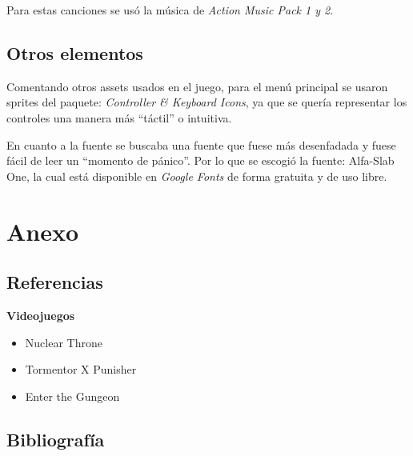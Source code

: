 \documentclass[12pt]{article}
\begin{document}
        Para estas canciones se usó la música de \textit{Action Music Pack 1 y 2}.
        
    \subsection{Otros elementos}
    
        Comentando otros assets usados en el juego, para el menú principal se usaron sprites del paquete: \textit{Controller \& Keyboard Icons}, ya que se quería representar los controles una manera más “táctil” o intuitiva.
        
        En cuanto a la fuente se buscaba una fuente que fuese más desenfadada y fuese fácil de leer un “momento de pánico”. Por lo que se escogió la fuente: Alfa-Slab One, la cual está disponible en \textit{Google Fonts} de forma gratuita y de uso libre.

\section{Anexo}
    \subsection{Referencias}
    
    \textbf{Videojuegos}
    \begin{itemize}
        \item Nuclear Throne
        \item Tormentor X Punisher
        \item Enter the Gungeon
    \end{itemize}
    
    \subsection{Bibliografía}
    \printbibliography[heading = none]
    \nocite{*}
\end{document}
